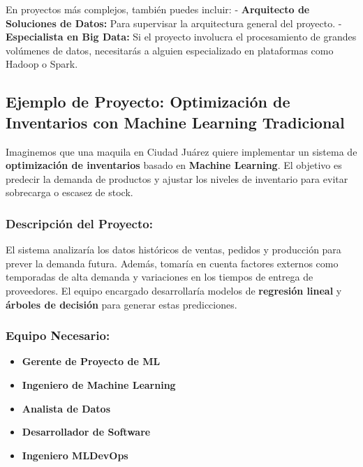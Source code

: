 \documentclass[
  10pt,
  letterpaper,
]{book}
\providecommand{\tightlist}{%
  \setlength{\itemsep}{0pt}\setlength{\parskip}{0pt}}\usepackage{longtable,booktabs,array}
\begin{document}
En proyectos más complejos, también puedes incluir: - \textbf{Arquitecto
de Soluciones de Datos:} Para supervisar la arquitectura general del
proyecto. - \textbf{Especialista en Big Data:} Si el proyecto involucra
el procesamiento de grandes volúmenes de datos, necesitarás a alguien
especializado en plataformas como Hadoop o Spark.

\subsection{\texorpdfstring{\textbf{Ejemplo de Proyecto: Optimización de
Inventarios con Machine Learning
Tradicional}}{Ejemplo de Proyecto: Optimización de Inventarios con Machine Learning Tradicional}}\label{ejemplo-de-proyecto-optimizaciuxf3n-de-inventarios-con-machine-learning-tradicional}

Imaginemos que una maquila en Ciudad Juárez quiere implementar un
sistema de \textbf{optimización de inventarios} basado en
\textbf{Machine Learning}. El objetivo es predecir la demanda de
productos y ajustar los niveles de inventario para evitar sobrecarga o
escasez de stock.

\subsubsection{\texorpdfstring{\textbf{Descripción del
Proyecto:}}{Descripción del Proyecto:}}\label{descripciuxf3n-del-proyecto-1}

El sistema analizaría los datos históricos de ventas, pedidos y
producción para prever la demanda futura. Además, tomaría en cuenta
factores externos como temporadas de alta demanda y variaciones en los
tiempos de entrega de proveedores. El equipo encargado desarrollaría
modelos de \textbf{regresión lineal} y \textbf{árboles de decisión} para
generar estas predicciones.

\subsubsection{\texorpdfstring{\textbf{Equipo
Necesario:}}{Equipo Necesario:}}\label{equipo-necesario}

\begin{itemize}
\tightlist
\item
  \textbf{Gerente de Proyecto de ML}
\item
  \textbf{Ingeniero de Machine Learning}
\item
  \textbf{Analista de Datos}
\item
  \textbf{Desarrollador de Software}
\item
  \textbf{Ingeniero MLDevOps}
\end{itemize}
\end{document}
